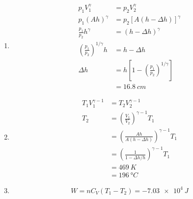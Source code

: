 \documentclass{article}
\begin{document}
\begin{enumerate}
  \item

        \begin{align*}
          p_1 V_1^\gamma                                & = p_2 V_2^\gamma                                                   \\
          p_1 (A h)^\gamma                              & = p_2 [A (h - \Delta h)]^\gamma                                    \\
          \frac{p_1}{p_2} h^\gamma                      & = (h - \Delta h)^\gamma                                            \\
          \left( \frac{p_1}{p_2} \right)^{1 / \gamma} h & = h - \Delta h                                                     \\
          \Delta h                                      & = h \left[ 1 - \left( \frac{p_1}{p_2} \right)^{1 / \gamma} \right] \\
                                                        & = \qty{16.8}{cm}
        \end{align*}

  \item

        \begin{align*}
          T_1 V_1^{\gamma - 1} & = T_2 V_2^{\gamma - 1}                                         \\
          T_2                  & = \left( \frac{V_1}{V_2} \right)^{\gamma - 1} T_1              \\
                               & = \left( \frac{A h}{A (h - \Delta h)} \right)^{\gamma - 1} T_1 \\
                               & = \left( \frac{1}{1 - \Delta h / h} \right)^{\gamma - 1} T_1   \\
                               & = \qty{469}{K}                                                 \\
                               & = \qty{196}{\degree C}
        \end{align*}

  \item \[W = n C_V (T_1 - T_2) = \qty{-7.03e4}{J}\]
\end{enumerate}

\setcounter{subsubsection}{58}
\subsubsection{}
\end{document}
